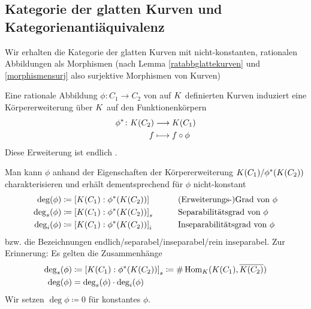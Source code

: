 
\subsection{Kategorie der glatten Kurven und Kategorienantiäquivalenz}
\begin{Bemerkung}
  Wir erhalten die Kategorie der glatten Kurven
  mit nicht-konstanten, rationalen Abbildungen als Morphismen 
  (nach Lemma \ref{ratabbglattekurven} und \ref{morphismensurj} also
  surjektive Morphismen von Kurven)
\end{Bemerkung}

\begin{LemmaDefinition}\label{funktionenkoerper}
  Eine rationale Abbildung $\phi\colon C_1\to C_2$ von auf $K$
  definierten Kurven induziert eine Körpererweiterung über $K$ auf
  den Funktionenkörpern
  \begin{align*}
    \phi^* \colon K(C_2) &\longrightarrow K(C_1)\\
    f &\longmapsto f\circ \phi
  \end{align*}
  Diese Erweiterung ist endlich
  \cite[siehe][Theorem II.2.4 (a)]{silverman}.

  Man kann $\phi$ anhand der Eigenschaften der Körpererweiterung
  $K(C_1)/\phi^*(K(C_2))$ charakterisieren und erhält
  dementsprechend für $\phi$ nicht-konstant
  \begin{alignat*}{2}
    \deg(\phi) &\coloneqq \left[ K(C_1) : \phi^*(K(C_2)) \right]
    \qquad&&\text{(Erweiterungs-)Grad von }\phi\\
    \operatorname{\deg}_s(\phi) &\coloneqq \left[ K(C_1) : \phi^*(K(C_2)) \right]_s
    \qquad&&\text{Separabilitätsgrad von }\phi\\
    \operatorname{\deg}_i(\phi) &\coloneqq \left[ K(C_1) : \phi^*(K(C_2)) \right]_i
    \qquad&&\text{Inseparabilitätsgrad von }\phi
  \end{alignat*}
  bzw. die Bezeichnungen endlich/separabel/inseparabel/rein
  inseparabel. Zur Erinnerung: Es gelten die Zusammenhänge
  \begin{align*}
    \operatorname{\deg}_s(\phi) 
    &\coloneqq \left[ K(C_1) : \phi^*(K(C_2)) \right]_s
    \coloneqq \#\operatorname{Hom}_K(K(C_1), \overline{K(C_2)})\\
    \deg(\phi) &= \operatorname{\deg}_s(\phi)\cdot\operatorname{\deg}_i(\phi)
  \end{align*}
  Wir setzen $\deg\phi\coloneqq 0$ für konstantes $\phi$.
\end{LemmaDefinition}

